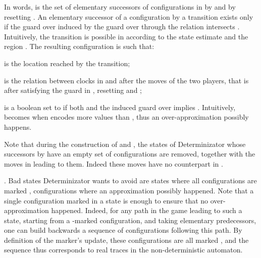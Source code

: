 \documentclass{LMCS}
\theoremstyle{plain}\newtheorem{proposition}[thm]{Proposition}
\begin{document}
\begin{iteMize}{}
\begin{iteMize}{}
In words,  is the set of elementary successors of
configurations in  by  and by resetting .  An
elementary successor of a configuration  by a transition
 exists only if the guard  over  induced by the guard  over  through
the relation  intersects . 
Intuitively, the transition is possible in  according to the
state estimate  and the region . The resulting configuration  is such that:
\begin{iteMize}{}
\item  is
the location reached by the transition; 
\item  is the relation between
clocks in  and  after the moves of the two players, that
is after satisfying the guard  in , resetting  and ; 
\item  is a boolean set to
 if both  and the induced guard 
over  implies .  Intuitively,  becomes  when
   encodes more values than , thus an over-approximation
  possibly happens.\end{iteMize}
\end{iteMize}
Note that during the construction of  and , the
states of Determinizator whose successors by  have an empty
set of configurations are removed, together with the moves in
 leading to them.  Indeed these moves have no counterpart in
.
\item . Bad states Determinizator wants to avoid are states where
all configurations are marked , \ie configurations where
an approximation possibly happened.
Note that a single configuration marked  in a state is enough to
ensure that no over-approximation happened. Indeed, for any path in
the game leading to such a state, starting from a -marked
configuration, and taking elementary predecessors, one can build
backwards a sequence of configurations following this path. By
definition of the marker's update, these configurations are all marked
, and the sequence thus corresponds to real traces in the
non-deterministic automaton.
\end{iteMize}
\end{document}
